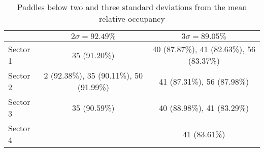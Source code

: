 \begin{table}
\begin{minipage}{\textwidth}
\begin{center}
\begin{singlespacing}

\caption{\label{tab:occp}Paddles below two and three standard deviations from the mean relative occupancy}

\begin{tabular}{lcc}

\hline \hline

 &  $2 \sigma = 92.49\%$ &  $3 \sigma = 89.05\%$ \\
 
\hline

Sector 1 & 35 (91.20\%) & 40 (87.87\%), 41 (82.63\%), 56 (83.37\%) \\
Sector 2 & 2 (92.38\%), 35 (90.11\%), 50 (91.99\%) &  41 (87.31\%), 56 (87.98\%)\\
Sector 3 & 35 (90.59\%) & 40 (88.98\%), 41 (83.29\%)\\
Sector 4 &  & 41 (83.61\%) \\

\hline \hline

\end{tabular}

\end{singlespacing}
\end{center}
\end{minipage}
\end{table}

